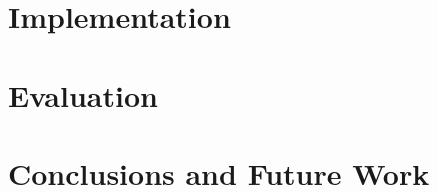 \documentclass[12pt,twoside]{report}
\begin{document}
\chapter{Implementation}





\chapter{Evaluation}



\chapter{Conclusions and Future Work}


% 

% 

% 

\printbibliography
\end{document}
